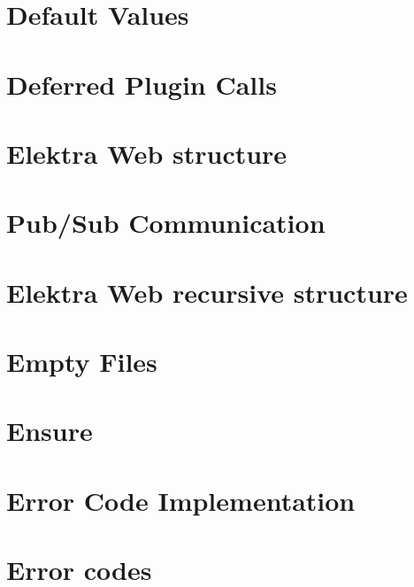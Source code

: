 \documentclass[twoside]{book}
\newcommand{\+}{\discretionary{\mbox{\scriptsize$\hookleftarrow$}}{}{}}
\begin{document}
\chapter{Default Values}
\label{doc_decisions_default_values_md}

\chapter{Deferred Plugin Calls}
\label{doc_decisions_deferred_plugin_calls_md}

\chapter{Elektra Web structure}
\label{doc_decisions_elektra_web_md}

\chapter{Pub/\+Sub Communication}
\label{doc_decisions_elektra_web_pubsub_md}

\chapter{Elektra Web recursive structure}
\label{doc_decisions_elektra_web_recursive_md}

\chapter{Empty Files}
\label{doc_decisions_empty_files_md}

\chapter{Ensure}
\label{doc_decisions_ensure_md}

\chapter{Error Code Implementation}
\label{doc_decisions_error_code_implementation_md}

\chapter{Error codes}
\label{doc_decisions_error_codes_md}

\end{document}
